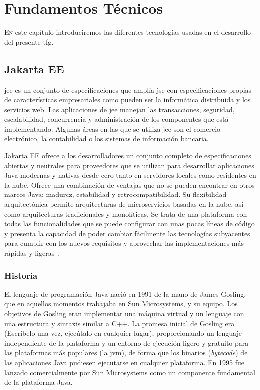 \chapter{Fundamentos Técnicos}
\label{chap:fmtos-técnicos}


\lettrine{E}{n} este capítulo introduciremos las diferentes tecnologías usadas en el desarrollo del presente \acrshort{tfg}.


\section{Jakarta EE}
\label{sec:jakartaEE}


\acrfull{jee} es un conjunto de especificaciones que amplía \acrfull{jse} con especificaciones propias de características empresariales como pueden ser la informática distribuida y los servicios web. Las aplicaciones de \acrshort{jee} manejan las transacciones, seguridad, escalabilidad, concurrencia y administración de los componentes que está implementando. Algunas áreas en las que se utiliza \acrshort{jee} son el comercio electrónico, la  contabilidad o los sistemas de información bancaria.

Jakarta EE ofrece a los desarrolladores un conjunto completo de especificaciones abiertas y neutrales para proveedores que se utilizan para desarrollar aplicaciones Java modernas y nativas desde cero tanto en servidores locales como residentes en la nube. Ofrece una combinación de ventajas que no se pueden encontrar en otros marcos Java: madurez, estabilidad y retrocompatibilidad. Su flexibilidad arquitectónica permite arquitecturas de microservicios basadas en la nube, así como arquitecturas tradicionales y monolíticas. Se trata de una plataforma con todas las funcionalidades que se puede configurar con unas pocas líneas de código y presenta la capacidad de poder cambiar fácilmente las tecnologías subyacentes para cumplir con los nuevos requisitos y aprovechar las implementaciones más rápidas y ligeras~\cite{JakartaEE-eclipse}. 


\subsection{Historia}
\label{sec:historia}

El lenguaje de programación Java nació en 1991 de la mano de James Gosling, que en aquellos momentos trabajaba en Sun Microsystems, y su equipo. Los objetivos de Gosling eran implementar una máquina virtual y un lenguaje con una estructura y sintaxis similar a C++. La promesa inicial de Gosling era   (Escríbelo una vez, ejecútalo en cualquier lugar), proporcionando un lenguaje independiente de la plataforma y un entorno de ejecución ligero y gratuito para las plataformas más populares (la \acrfull{jvm}), de forma que los binarios (\emph{bytecode}) de las aplicaciones Java pudiesen ejecutarse en cualquier plataforma. En 1995 fue lanzado comercialmente por Sun Microsystems como un componente fundamental de la plataforma Java. 

